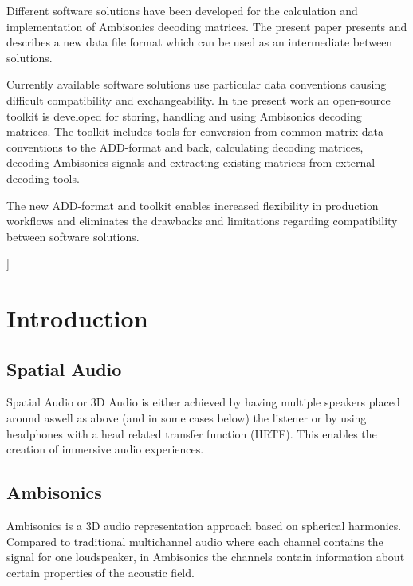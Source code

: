 \documentclass[a4paper, 10pt, twocolumn]{article}
\begin{document}
{\vspace{-3mm}}
\begin{onecolabstract}
{\vspace{3mm}}

Different software solutions have been developed for the calculation and implementation of Ambisonics decoding matrices. The present paper presents and describes a new data file format which can be used as an intermediate between solutions.

Currently available software solutions use particular data conventions causing difficult compatibility and exchangeability. In the present work an open-source toolkit is developed for storing, handling and using Ambisonics decoding matrices. The toolkit includes tools for conversion from common matrix data conventions to the ADD-format and back, calculating decoding matrices, decoding Ambisonics signals and extracting existing matrices from external decoding tools. 

The new ADD-format and toolkit enables increased flexibility in production workflows and eliminates the drawbacks and limitations regarding compatibility between software solutions.

\end{onecolabstract}
{\vspace{8mm}}]

\section{Introduction} \label{sec:introduction}

\subsection{Spatial Audio}

Spatial Audio or 3D Audio is either achieved by having multiple speakers placed around aswell as above (and in some cases below) the listener or by using headphones with a head related transfer function (HRTF). This enables the creation of immersive audio experiences.

\subsection{Ambisonics}

Ambisonics is a 3D audio representation approach based on spherical harmonics. Compared to traditional multichannel audio where each channel contains the signal for one loudspeaker, in Ambisonics the channels contain information about certain properties of the acoustic field.
\end{document}
